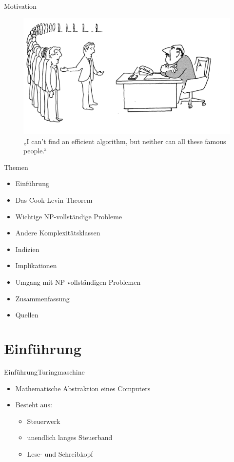 \documentclass[ignorenonframetext,]{beamer}
\begin{document}
\begin{frame}{Motivation}
	\begin{figure}
		\centering
		\includegraphics{img/Comic3.png}\\
		{\small „I can't find an efficient algorithm, but neither can all these famous people.“}
	\end{figure}
\end{frame}


\begin{frame}{Themen}
\begin{itemize}
	\item Einführung
	\item Das Cook-Levin Theorem
	\item Wichtige NP-vollständige Probleme
	\item Andere Komplexitätsklassen
	\item Indizien
	\item Implikationen
	\item Umgang mit NP-vollständigen Problemen
	\item Zusammenfassung
	\item Quellen
\end{itemize}
\end{frame}


\section{Einführung}\label{einfuxfchrung}

\begin{frame}{Einführung}{Turingmaschine}
\begin{itemize}
\itemsep1pt\parskip0pt
\item
  Mathematische Abstraktion eines Computers
\item
  Besteht aus:

  \begin{itemize}
  \itemsep1pt\parskip0pt
  \item
    Steuerwerk
  \item
    unendlich langes Steuerband
  \item
    Lese- und Schreibkopf
  \end{itemize}
\end{itemize}

\end{frame}
\end{document}
